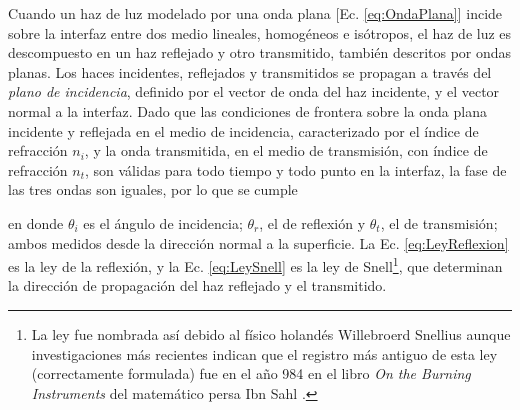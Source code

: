 Cuando un haz de luz modelado por una onda plana [Ec. \eqref{eq:OndaPlana}] incide sobre la interfaz entre dos medio lineales, homogéneos e isótropos, el haz de luz es descompuesto en un haz reflejado y otro transmitido, también descritos por ondas planas. Los haces incidentes, reflejados y transmitidos se propagan a través del \emph{plano de incidencia}, definido por el vector de onda del haz incidente, y el vector normal a la interfaz. Dado que las condiciones de frontera sobre la onda plana incidente y reflejada en el medio de incidencia, caracterizado por el índice de refracción $n_i$, y la onda transmitida, en el medio de transmisión, con índice de refracción $n_t$, son válidas para todo tiempo y todo punto en la interfaz, la fase de las tres ondas son iguales, por lo que se cumple \vspace*{-.5em} 
%
	\begin{tcolorbox}[title = Ley de la reflexión y ley de Snell ]
	\end{tcolorbox}	 \vspace*{-.5em}\noindent
%
en donde $\theta_i$ es el ángulo de incidencia; $\theta_r$, el de reflexión y $\theta_t$, el de transmisión; ambos medidos desde la dirección normal a la superficie. La Ec. \eqref{eq:LeyReflexion} es la ley de la reflexión, y la Ec. \eqref{eq:LeySnell} es la ley de Snell\footnote{La ley fue nombrada así debido al físico holandés Willebroerd Snellius aunque investigaciones más recientes indican que el registro más antiguo de esta ley (correctamente formulada) fue en el año 984 en el libro \emph{On the Burning Instruments} del matemático persa Ibn Sahl \cite{kwan2002really}.}, que determinan la dirección de propagación del haz reflejado y el transmitido.

